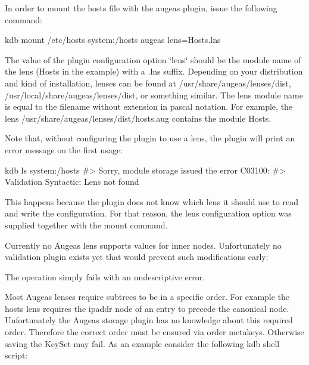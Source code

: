 In order to mount the hosts file with the augeas plugin, issue the following command\+:


\begin{DoxyCode}
kdb mount /etc/hosts system:/hosts augeas lens=Hosts.lns
\end{DoxyCode}


The value of the plugin configuration option \char`\"{}lens\char`\"{} should be the module name of the lens (Hosts in the example) with a \textquotesingle{}.lns\textquotesingle{} suffix. Depending on your distribution and kind of installation, lenses can be found at {\ttfamily /usr/share/augeas/lenses/dist}, {\ttfamily /usr/local/share/augeas/lenses/dist}, or something similar. The lens module name is equal to the filename without extension in pascal notation. For example, the lens {\ttfamily /usr/share/augeas/lenses/dist/hosts.aug} contains the module Hosts.

Note that, without configuring the plugin to use a lens, the plugin will print an error message on the first usage\+:


\begin{DoxyCode}
kdb ls system:/hosts
#> Sorry, module storage issued the error C03100:
#> Validation Syntactic: Lens not found
\end{DoxyCode}


This happens because the plugin does not know which lens it should use to read and write the configuration. For that reason, the lens configuration option was supplied together with the mount command.

Currently no Augeas lens supports values for inner nodes. Unfortunately no validation plugin exists yet that would prevent such modifications early\+:




The operation simply fails with an undescriptive error.

Most Augeas lenses require subtrees to be in a specific order. For example the hosts lens requires the ipaddr node of an entry to precede the canonical node. Unfortunately the Augeas storage plugin has no knowledge about this required order. Therefore the correct order must be ensured via order metakeys. Otherwise saving the Key\+Set may fail. As an example consider the following kdb shell script\+:


